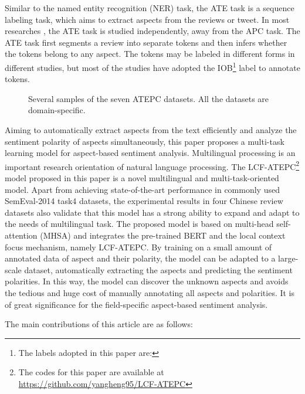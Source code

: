\documentclass[a4paper,fleqn]{cas-sc}
\begin{document}
Similar to the named entity recognition \cite{sang2003introduction} (NER) task, the ATE task is a sequence labeling task, which aims to extract aspects from the reviews or tweet. In most researches \cite{chen2017recurrent, xue2018aspect, chen2017improving}, the ATE task is studied independently, away from the APC task. The ATE task first segments a review into separate tokens and then infers whether the tokens belong to any aspect. The tokens may be labeled in different forms in different studies, but most of the studies have adopted the IOB\footnote{The labels adopted in this paper are: } label to annotate tokens.

\begin{figure*}[pos=h]
	\centering
	\caption{Several samples of the seven ATEPC datasets. All the datasets are domain-specific.}
	\label{fig:samples}
\end{figure*}

Aiming to automatically extract aspects from the text efficiently and analyze the sentiment polarity of aspects simultaneously, this paper proposes a multi-task learning model for aspect-based sentiment analysis. Multilingual processing is an important research orientation of natural language processing. The LCF-ATEPC\footnote{The codes for this paper are available at \url{https://github.com/yangheng95/LCF-ATEPC}} model proposed in this paper is a novel multilingual and multi-task-oriented model. Apart from achieving state-of-the-art performance in commonly used SemEval-2014 task4 datasets, the experimental results in four Chinese review datasets also validate that this model has a strong ability to expand and adapt to the needs of multilingual task. The proposed model is based on multi-head self-attention (MHSA) and integrates the pre-trained BERT \cite{devlin2019bert} and the local context focus mechanism, namely LCF-ATEPC. By training on a small amount of annotated data of aspect and their polarity, the model can be adapted to a large-scale dataset, automatically extracting the aspects and predicting the sentiment polarities. In this way, the model can discover the unknown aspects and avoids the tedious and huge cost of manually annotating all aspects and polarities. It is of great significance for the field-specific aspect-based sentiment analysis.

The main contributions of this article are as follows:
\end{document}
